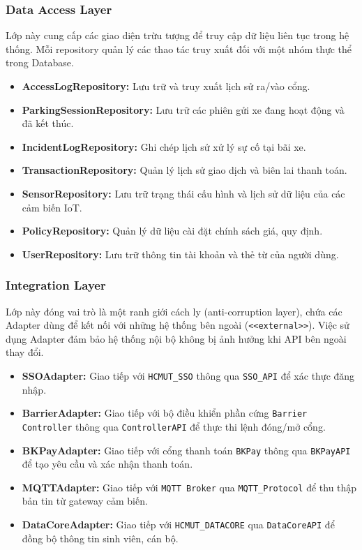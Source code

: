 \subsubsection{Data Access Layer}
Lớp này cung cấp các giao diện trừu tượng để truy cập dữ liệu liên tục trong hệ thống. Mỗi repository quản lý các thao tác truy xuất đối với một nhóm thực thể trong Database.
\begin{itemize}
    \item \textbf{AccessLogRepository:} Lưu trữ và truy xuất lịch sử ra/vào cổng.
    \item \textbf{ParkingSessionRepository:} Lưu trữ các phiên gửi xe đang hoạt động và đã kết thúc.
    \item \textbf{IncidentLogRepository:} Ghi chép lịch sử xử lý sự cố tại bãi xe.
    \item \textbf{TransactionRepository:} Quản lý lịch sử giao dịch và biên lai thanh toán.
    \item \textbf{SensorRepository:} Lưu trữ trạng thái cấu hình và lịch sử dữ liệu của các cảm biến IoT.
    \item \textbf{PolicyRepository:} Quản lý dữ liệu cài đặt chính sách giá, quy định.
    \item \textbf{UserRepository:} Lưu trữ thông tin tài khoản và thẻ từ của người dùng.
\end{itemize}

\subsubsection{Integration Layer}
Lớp này đóng vai trò là một ranh giới cách ly (anti-corruption layer), chứa các Adapter dùng để kết nối với những hệ thống bên ngoài (\texttt{<<external>>}). Việc sử dụng Adapter đảm bảo hệ thống nội bộ không bị ảnh hưởng khi API bên ngoài thay đổi.
\begin{itemize}
    \item \textbf{SSOAdapter:} Giao tiếp với \texttt{HCMUT\_SSO} thông qua \texttt{SSO\_API} để xác thực đăng nhập.
    \item \textbf{BarrierAdapter:} Giao tiếp với bộ điều khiển phần cứng \texttt{Barrier Controller} thông qua \texttt{ControllerAPI} để thực thi lệnh đóng/mở cổng.
    \item \textbf{BKPayAdapter:} Giao tiếp với cổng thanh toán \texttt{BKPay} thông qua \texttt{BKPayAPI} để tạo yêu cầu và xác nhận thanh toán.
    \item \textbf{MQTTAdapter:} Giao tiếp với \texttt{MQTT Broker} qua \texttt{MQTT\_Protocol} để thu thập bản tin từ gateway cảm biến.
    \item \textbf{DataCoreAdapter:} Giao tiếp với \texttt{HCMUT\_DATACORE} qua \texttt{DataCoreAPI} để đồng bộ thông tin sinh viên, cán bộ.
\end{itemize}

